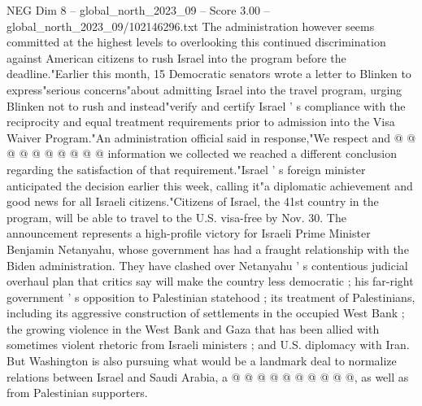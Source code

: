 \begin{textsample}{NEG Dim 8 – global\_north\_2023\_09 – Score 3.00 – global\_north\_2023\_09/102146296.txt}
The administration however seems committed at the highest levels to overlooking this continued discrimination against American citizens to rush Israel into the program before the deadline."Earlier this month, 15 Democratic senators wrote a letter to Blinken to express"serious concerns"about admitting Israel into the travel program, urging Blinken not to rush and instead"verify and certify Israel ' s compliance with the reciprocity and equal treatment requirements prior to admission into the Visa Waiver Program."An administration official said in response,"We respect and @ @ @ @ @ @ @ @ @ @ information we collected we reached a different conclusion regarding the satisfaction of that requirement."Israel ' s foreign minister anticipated the decision earlier this week, calling it"a diplomatic achievement and good news for all Israeli citizens."Citizens of Israel, the 41st country in the program, will be able to travel to the U.S. visa-free by Nov. 30.
The announcement represents a high-profile victory for Israeli Prime Minister Benjamin Netanyahu, whose government has had a fraught relationship with the Biden administration.
They have clashed over Netanyahu ' s contentious judicial overhaul plan that critics say will make the country less democratic ; his far-right government ' s opposition to Palestinian statehood ; its treatment of Palestinians, including its aggressive construction of settlements in the occupied West Bank ; the growing violence in the West Bank and Gaza that has been allied with sometimes violent rhetoric from Israeli ministers ; and U.S. diplomacy with Iran.
But Washington is also pursuing what would be a landmark deal to normalize relations between Israel and Saudi Arabia, a @ @ @ @ @ @ @ @ @ @, as well as from Palestinian supporters.

\end{textsample}
